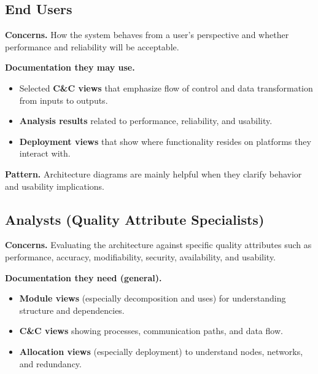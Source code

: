 \documentclass[11pt]{article}
\begin{document}
\subsection{End Users}

\textbf{Concerns.} How the system behaves from a user's perspective and whether performance and reliability will be acceptable.

\medskip
\noindent
\textbf{Documentation they may use.}
\begin{itemize}[noitemsep]
  \item Selected \textbf{C\&C views} that emphasize flow of control and data transformation from inputs to outputs.
  \item \textbf{Analysis results} related to performance, reliability, and usability.
  \item \textbf{Deployment views} that show where functionality resides on platforms they interact with.
\end{itemize}

\noindent
\textbf{Pattern.} Architecture diagrams are mainly helpful when they clarify behavior and usability implications.

\subsection{Analysts (Quality Attribute Specialists)}

\textbf{Concerns.} Evaluating the architecture against specific quality attributes such as performance, accuracy, modifiability, security, availability, and usability.

\medskip
\noindent
\textbf{Documentation they need (general).}
\begin{itemize}[noitemsep]
  \item \textbf{Module views} (especially decomposition and uses) for understanding structure and dependencies.
  \item \textbf{C\&C views} showing processes, communication paths, and data flow.
  \item \textbf{Allocation views} (especially deployment) to understand nodes, networks, and redundancy.
\end{itemize}
\end{document}
